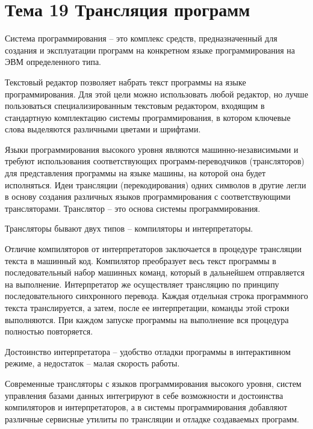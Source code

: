 \newpage 
\chapter{Тема 19 Трансляция программ}

\begin{opr}
  Система программирования – это комплекс средств, предназначенный для создания и эксплуатации программ на конкретном языке программирования на ЭВМ определенного типа.
\end{opr}

Текстовый редактор позволяет набрать текст программы на языке программирования. Для этой цели можно использовать любой редактор, но лучше пользоваться специализированным текстовым редактором, входящим в стандартную комплектацию системы программирования, в котором ключевые слова выделяются различными цветами и шрифтами.

Языки программирования высокого уровня являются машинно-независимыми и требуют использования соответствующих программ-переводчиков (трансляторов) для представления программы на языке машины, на которой она будет исполняться. Идеи трансляции (перекодирования) одних символов в другие легли в основу создания различных языков программирования с соответствующими трансляторами. Транслятор – это основа системы программирования. 

\begin{utv}
  Трансляторы бывают двух типов – компиляторы и интерпретаторы.
\end{utv}

Отличие компиляторов от интерпретаторов заключается в процедуре трансляции текста в машинный код. Компилятор преобразует весь текст программы в последовательный набор машинных команд, который в дальнейшем отправляется на выполнение. Интерпретатор же осуществляет трансляцию по принципу последовательного синхронного перевода. Каждая отдельная строка программного текста транслируется, а затем, после ее интерпретации, команды этой строки выполняются. При каждом запуске программы на выполнение вся процедура полностью повторяется.

\begin{utv}
  Достоинство интерпретатора – удобство отладки программы в интерактивном режиме, а недостаток – малая скорость работы.
\end{utv}

Современные трансляторы с языков программирования высокого уровня, систем управления базами данных интегрируют в себе возможности и достоинства компиляторов и интерпретаторов, а в системы программирования добавляют различные сервисные утилиты по трансляции и отладке создаваемых программ.

